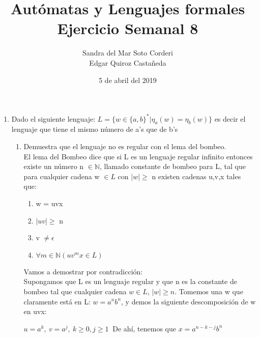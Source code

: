 \documentclass{article}
\begin{document}
    \title{
        Autómatas y Lenguajes formales \\
        Ejercicio Semanal 8
    }

    \author{
        Sandra del Mar Soto Corderi \\
        Edgar Quiroz Castañeda
    }

    \date{
        5 de abril del 2019
    }
    
    \maketitle

    \begin{enumerate}
        \item {
        Dado el siguiente lenguaje: $L = \{w \in \{a,b\}^* | \eta_a(w) = \eta_b(w) \}$ es decir el lenguaje que tiene el mismo número de a's que de b's
        \begin{enumerate}
        	\item {
        	Demuestra que el lenguaje no es regular con el lema del bombeo.\\
        	
        	El lema del Bombeo dice que si L es un lenguaje regular infinito entonces existe un número n $\in \mathbb{N}$, llamado constante de bombeo para L, tal que para cualquier cadena w $\in L$ con $|w| \geq$ n existen cadenas u,v,x tales que:        	
        	\begin{enumerate}
        		\item {
        		w = uvx
        		}
        		\item {
        		$|uv| \geq$ n
        		}
       		 	\item {
        		v $\neq \epsilon$
        		}
    			\item {
    			$\forall m \in \mathbb{N} (uv^mx \in L)$
    			}
        	\end{enumerate}
        	
        	Vamos a demostrar por contradicción:\\
        	
        	Supongamos que L es un lenguaje regular y que n es la constante de bombeo tal que cualquier cadena $w \in L$, $|w| \geq n$. Tomemos una w que claramente está en L: $w = a^nb^n$, y demos la siguiente descomposición de w en uvx:
        	
        	$u = a^k, \ v= a^j, \  k \geq 0, j \geq 1 \ $ 
        	De ahí, tenemos que $x = a^{n-k-j}b^n$\\
        	
}
\end{enumerate}}
\end{enumerate}
\end{document}

